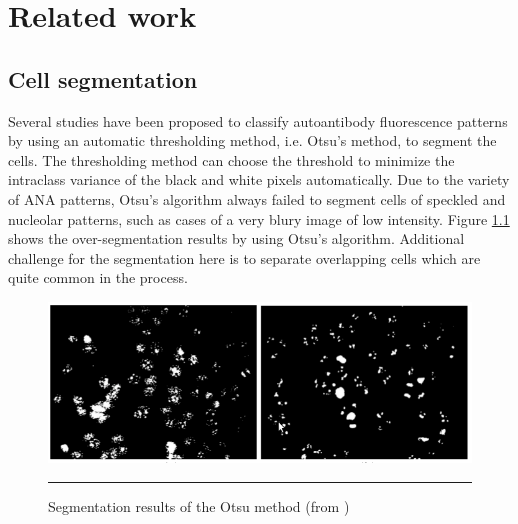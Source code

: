 
\chapter{Related work} 

\label{Chapter3} %



\section{Cell segmentation}

Several studies have been proposed to classify autoantibody fluorescence patterns by using an automatic thresholding method, i.e.  Otsu's method, to segment the cells. The  thresholding method can choose the threshold to minimize the intraclass variance of the black and white pixels automatically. Due to the variety of ANA patterns,  Otsu's algorithm always failed to segment cells of speckled and nucleolar patterns, such as cases of a very blury image of low intensity. Figure \ref{fig:BadSegment} shows the over-segmentation results by using Otsu's algorithm. Additional challenge for the segmentation here is to separate overlapping cells which are quite common in the process.

\begin{figure}[htbp]
	\centering
	\includegraphics[scale=0.4]{Figures/introduction/badsegmentation}
	\rule{35em}{0.5pt}
	\caption[Bad segmentation example]{Segmentation results of the Otsu method (from \cite{Huang2008})}
	\label{fig:BadSegment}

\end{figure}


